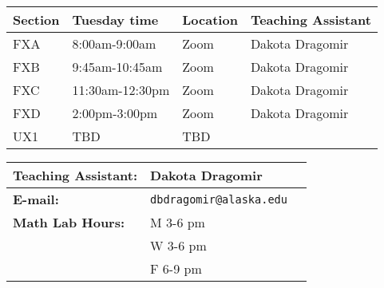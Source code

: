 \documentclass[12pt,fleqn]{article}
\begin{document}
\begin{tabular}{| l | l | l | l |}
 
\hline
\textbf{Section} & \textbf{Tuesday time} & \textbf{Location}& \textbf{Teaching Assistant} \\
\hline \hline
FXA&8:00am-9:00am&Zoom& Dakota Dragomir\\ \hline
FXB&9:45am-10:45am&Zoom& Dakota Dragomir\\ \hline
FXC&11:30am-12:30pm&Zoom& Dakota Dragomir\\ \hline
FXD&2:00pm-3:00pm&Zoom& Dakota Dragomir\\ \hline
UX1&TBD&TBD&\\ \hline
\end{tabular}

\vspace{1cm}
\begin{tabular}{| l || l | l |}
\hline
\textbf{Teaching Assistant:}& Dakota Dragomir \\
\hline \hline
\textbf{E-mail:}&\texttt{dbdragomir@alaska.edu} \texttt{} \\
\hline
\textbf{Math Lab Hours:}& M 3-6 pm\\
& W 3-6 pm\\
& F 6-9 pm\\
\hline

\hline
\end{tabular}

\vfill


%
%
%
\end{document}
